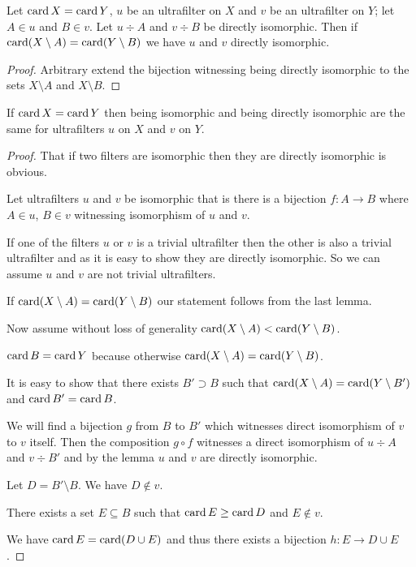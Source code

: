 \begin{lem}
Let $\operatorname{card} X=\operatorname{card} Y$, $u$ be an ultrafilter on $X$ and $v$ be
an ultrafilter on $Y$; let $A\in u$ and $B\in v$. Let $u\div A$
and $v\div B$ be directly isomorphic. Then if $\operatorname{card}(X\setminus A)=\operatorname{card}(Y\setminus B)$
we have $u$ and $v$ directly isomorphic.\end{lem}
\begin{proof}
Arbitrary extend the bijection witnessing being directly isomorphic
to the sets $X\setminus A$ and $X\setminus B$.\end{proof}
\begin{thm}
If $\operatorname{card} X=\operatorname{card} Y$ then being isomorphic and being directly isomorphic
are the same for ultrafilters $u$ on $X$ and $v$ on $Y$.\end{thm}
\begin{proof}
That if two filters are isomorphic then they are directly isomorphic
is obvious.

Let ultrafilters $u$ and $v$ be isomorphic that is there is a bijection
$f:A\rightarrow B$ where $A\in u$, $B\in v$ witnessing isomorphism
of $u$ and $v$.

If one of the filters $u$ or $v$ is a trivial ultrafilter then the
other is also a trivial ultrafilter and as it is easy to show they
are directly isomorphic. So we can assume $u$ and $v$ are not trivial
ultrafilters.

If $\operatorname{card}(X\setminus A)=\operatorname{card}(Y\setminus B)$ our statement follows
from the last lemma.

Now assume without loss of generality $\operatorname{card}(X\setminus A)<\operatorname{card}(Y\setminus B)$.

$\operatorname{card} B=\operatorname{card} Y$ because otherwise $\operatorname{card}(X\setminus A)=\operatorname{card}(Y\setminus B)$.

It is easy to show that there exists $B'\supset B$ such that $\operatorname{card}(X\setminus A)=\operatorname{card}(Y\setminus B')$
and $\operatorname{card} B'=\operatorname{card} B$.

We will find a bijection $g$ from $B$ to $B'$ which witnesses direct
isomorphism of $v$ to $v$ itself. Then the composition $g\circ f$
witnesses a direct isomorphism of $u\div A$ and $v\div B'$ and by
the lemma $u$ and $v$ are directly isomorphic.

Let $D=B'\setminus B$. We have $D\notin v$.

There exists a set $E\subseteq B$ such that $\operatorname{card} E\ge\operatorname{card} D$
and $E\notin v$.

We have $\operatorname{card} E=\operatorname{card}(D\cup E)$ and thus there exists a bijection
$h:E\rightarrow D\cup E$.


\end{proof}
